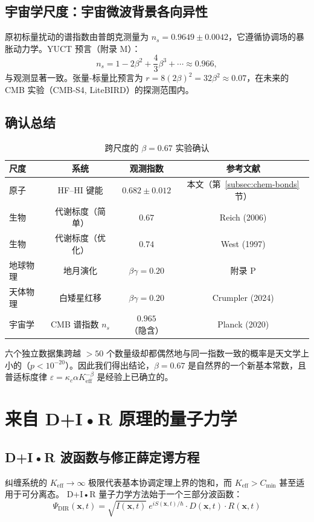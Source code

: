\documentclass[11pt,a4paper]{article}
\begin{document}
	\subsection{宇宙学尺度：宇宙微波背景各向异性}
	\label{subsec:cmb}
	
	原初标量扰动的谱指数由普朗克测量为 \(n_s = 0.9649 \pm 0.0042\)，它遵循协调场的暴胀动力学。YUCT 预言（附录 M）：
	\[
	n_s = 1 - 2\beta^2 + \frac{4}{3}\beta^3 + \cdots \approx 0.966,
	\]
	与观测显著一致。张量-标量比预言为 \(r = 8(2\beta)^2 = 32\beta^2 \approx 0.07\)，在未来的 CMB 实验（CMB‑S4, LiteBIRD）的探测范围内。
	
	\subsection{确认总结}
	
	\begin{table}[h]
		\centering
		\caption{跨尺度的 \(\beta = 0.67\) 实验确认}
		\label{tab:confirmations}
		\begin{tabular}{lccc}
			\toprule
			尺度 & 系统 & 观测指数 & 参考文献 \\
			\midrule
			原子 & HF–HI 键能 & \(0.682 \pm 0.012\) & 本文（第~\ref{subsec:chem-bonds}节） \\
			生物 & 代谢标度（简单） & \(0.67\) & Reich (2006) \\
			生物 & 代谢标度（优化） & \(0.74\) & West (1997) \\
			地球物理 & 地月演化 & \(\beta\gamma = 0.20\) & 附录 P \\
			天体物理 & 白矮星红移 & \(\beta\gamma = 0.20\) & Crumpler (2024) \\
			宇宙学 & CMB 谱指数 \(n_s\) & \(0.965\)（隐含） & Planck (2020) \\
			\bottomrule
		\end{tabular}
	\end{table}
	
	六个独立数据集跨越 \(>50\) 个数量级却都偶然地与同一指数一致的概率是天文学上小的（\(p < 10^{-20}\)）。因此我们得出结论，\(\beta = 0.67\) 是自然界的一个新基本常数，且普适标度律 \(\varepsilon = \kappa_c \alpha K_{\mathrm{eff}}^{-\beta}\) 是经验上已确立的。
	
	\section{来自 D+I•R 原理的量子力学}
	\subsection{D+I•R 波函数与修正薛定谔方程}
	纠缠系统的 $K_{\mathrm{eff}} \to \infty$ 极限代表基本协调定理上界的饱和，而 $K_{\mathrm{eff}} > C_{\min}$ 甚至适用于可分离态。
	D+I•R 量子力学方法始于一个三部分波函数：
	\begin{equation}
		\Psi_{\text{DIR}}(\mathbf{x},t) = \sqrt{I(\mathbf{x},t)} \ e^{iS(\mathbf{x},t)/\hbar} \cdot D(\mathbf{x},t) \cdot R(\mathbf{x},t)
	\end{equation}
	
\end{document}
